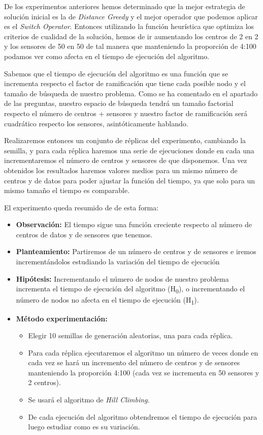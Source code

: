 \documentclass{article}
\begin{document}
\begin{enumerate}
  De los experimentos anteriores hemos determinado que la mejor estrategia de solución inicial es la de \textit{Distance Greedy} y el mejor operador que podemos aplicar es el \textit{Switch Operator}. Entonces utilizando la función heurística que optimiza los criterios de cualidad de la solución, hemos de ir aumentando los centros de 2 en 2 y los sensores de 50 en 50 de tal manera que manteniendo la proporción de 4:100 podamos ver como afecta en el tiempo de ejecución del algoritmo.

  Sabemos que el tiempo de ejecución del algoritmo es una función que se incrementa respecto el factor de ramificación que tiene cada posible nodo y el tamaño de búsqueda de nuestro problema. Como se ha comentado en el apartado de las preguntas, nuestro espacio de búsqueda tendrá un tamaño factorial respecto el número de centros + sensores y nuestro factor de ramificación será cuadrático respecto los sensores, asintóticamente hablando.

  Realizaremos entonces un conjunto de réplicas del experimento, cambiando la semilla, y para cada réplica haremos una serie de ejecuciones donde en cada una incrementaremos el número de centros y sensores de que disponemos.
  Una vez obtenidos los resultados haremos valores medios para un mismo número de centros y de datos para poder ajustar la función del tiempo, ya que solo para un mismo tamaño el tiempo es comparable.

  El experimento queda resumido de de esta forma:

  \begin{itemize}
    \item \textbf{Observación:} El tiempo sigue una función creciente respecto al número de centros de datos y de sensores que tenemos.
    \item \textbf{Planteamiento:} Partiremos de un número de centros y de sensores e iremos incrementándolos estudiando la variación del tiempo de ejecución
    \item \textbf{Hipótesis:} Incrementando el número de nodos de nuestro problema incrementa el tiempo de ejecución del algoritmo (H\textsubscript{0}), o incrementando el número de nodos no afecta en el tiempo de ejecución (H\textsubscript{1}).
    \item \textbf{Método experimentación:}
    \begin{itemize}
      \item Elegir 10 semillas de generación aleatorias, una para cada réplica.
      \item Para cada réplica ejecutaremos el algoritmo un número de veces donde en cada vez se hará un incremento del número de centros y de sensores manteniendo la proporción 4:100 (cada vez se incrementa en 50 sensores y 2 centros).
      \item Se usará el algoritmo de \textit{Hill Climbing}.
      \item De cada ejecución del algoritmo obtendremos el tiempo de ejecución para luego estudiar como es su variación.
    \end{itemize}
  \end{itemize}


\end{enumerate}
\end{document}
